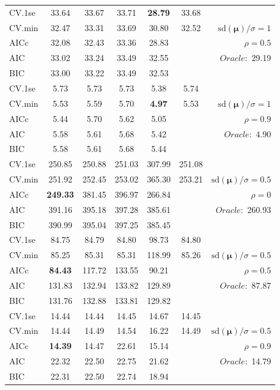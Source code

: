 \begin{table}
\begin{center}
\begin{tabular}{l*{5}{c}|r}
 \hline 
CV.1se & 33.64 & 33.67 & 33.71 & {\bf 28.79} & 33.68 & \\
CV.min & 32.47 & 33.31 & 33.69 & 30.80 & 32.52 &  $\mathrm{sd}(\mathbf{\mu})/\sigma=1$ \\
AICc & 32.08 & 32.43 & 33.36 & 28.83 & & $\rho=0.5$ \\
AIC & 33.02 & 33.24 & 33.49 & 32.55 & &  \multirow{2}{*}{$Oracle: $ 29.19} \\
BIC & 33.00 & 33.22 & 33.49 & 32.53 & &  \\
 \hline 
CV.1se & 5.73 & 5.73 & 5.73 & 5.38 & 5.74 & \\
CV.min & 5.53 & 5.59 & 5.70 & {\bf 4.97} & 5.53 &  $\mathrm{sd}(\mathbf{\mu})/\sigma=1$ \\
AICc & 5.44 & 5.70 & 5.62 & 5.05 & & $\rho=0.9$ \\
AIC & 5.58 & 5.61 & 5.68 & 5.42 & &  \multirow{2}{*}{$Oracle: $ 4.90} \\
BIC & 5.58 & 5.61 & 5.68 & 5.44 & &  \\
 \hline 
CV.1se & 250.85 & 250.88 & 251.03 & 307.99 & 251.08 & \\
CV.min & 251.92 & 252.45 & 253.02 & 365.30 & 253.21 &  $\mathrm{sd}(\mathbf{\mu})/\sigma=0.5$ \\
AICc & {\bf 249.33} & 381.45 & 396.97 & 266.84 & & $\rho=0$ \\
AIC & 391.16 & 395.18 & 397.28 & 385.61 & &  \multirow{2}{*}{$Oracle: $ 260.93} \\
BIC & 390.99 & 395.04 & 397.25 & 385.45 & &  \\
 \hline 
CV.1se & 84.75 & 84.79 & 84.80 & 98.73 & 84.80 & \\
CV.min & 85.25 & 85.31 & 85.31 & 118.99 & 85.26 &  $\mathrm{sd}(\mathbf{\mu})/\sigma=0.5$ \\
AICc & {\bf 84.43} & 117.72 & 133.55 & 90.21 & & $\rho=0.5$ \\
AIC & 131.83 & 132.94 & 133.82 & 129.89 & &  \multirow{2}{*}{$Oracle: $ 87.87} \\
BIC & 131.76 & 132.88 & 133.81 & 129.82 & &  \\
 \hline 
CV.1se & 14.44 & 14.44 & 14.45 & 14.67 & 14.45 & \\
CV.min & 14.44 & 14.49 & 14.54 & 16.22 & 14.49 &  $\mathrm{sd}(\mathbf{\mu})/\sigma=0.5$ \\
AICc & {\bf 14.39} & 14.47 & 22.61 & 15.14 & & $\rho=0.9$ \\
AIC & 22.32 & 22.50 & 22.75 & 21.62 & &  \multirow{2}{*}{$Oracle: $ 14.79} \\
BIC & 22.31 & 22.50 & 22.74 & 18.94 & &  \\
 \hline 
\end{tabular}
\end{center}
\vspace{-1cm}
\end{table}





